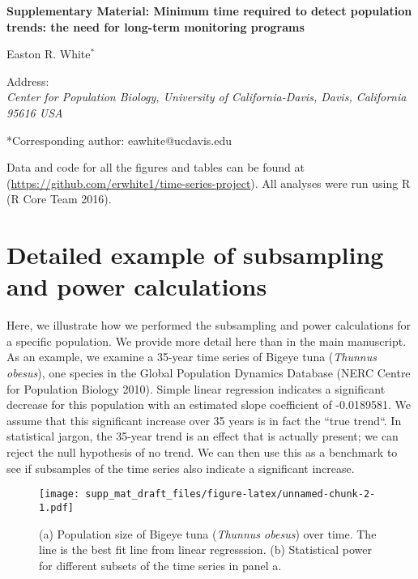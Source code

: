\documentclass[12pt,]{article}
\title{}
\author{}
\date{}
\begin{document}
\vspace{2cm}

\begin{center}
 \textbf{Supplementary Material: Minimum time required to detect population trends: the need for long-term monitoring programs}
 
Easton R. White$^{*}$
\vspace{3 mm}

Address: \\ \emph{Center for Population Biology, University of California-Davis, Davis, California 95616 USA}

*Corresponding author: eawhite@ucdavis.edu

 \end{center}

\vspace{2cm}

\tableofcontents

\vspace{1cm}

Data and code for all the figures and tables can be found at
(\url{https://github.com/erwhite1/time-series-project}). All analyses
were run using R (R Core Team 2016).

\vspace{2cm}

\clearpage

\section{Detailed example of subsampling and power
calculations}\label{detailed-example-of-subsampling-and-power-calculations}

Here, we illustrate how we performed the subsampling and power
calculations for a specific population. We provide more detail here than
in the main manuscript. As an example, we examine a 35-year time series
of Bigeye tuna (\emph{Thunnus obesus}), one species in the Global
Population Dynamics Database (NERC Centre for Population Biology 2010).
Simple linear regression indicates a significant decrease for this
population with an estimated slope coefficient of -0.0189581. We assume
that this significant increase over 35 years is in fact the ``true
trend``. In statistical jargon, the 35-year trend is an effect that is
actually present; we can reject the null hypothesis of no trend. We can
then use this as a benchmark to see if subsamples of the time series
also indicate a significant increase.

\begin{figure}[htbp]
\centering
\texttt{[image: supp\_mat\_draft\_files/figure-latex/unnamed-chunk-2-1.pdf]}
\caption{(a) Population size of Bigeye tuna (\emph{Thunnus obesus}) over
time. The line is the best fit line from linear regresssion. (b)
Statistical power for different subsets of the time series in panel
a.\label{fig:empirical_approach_example}}
\end{figure}
\end{document}
